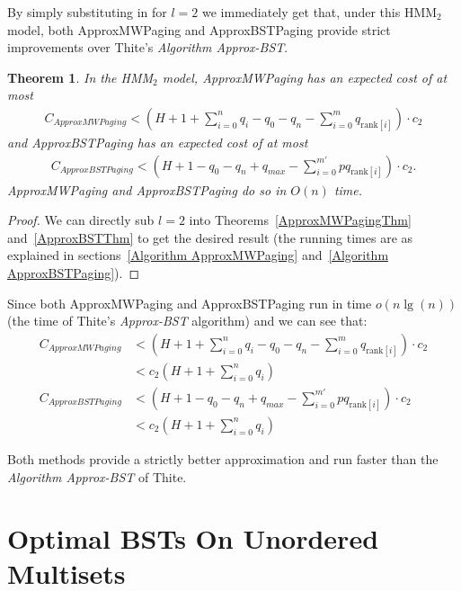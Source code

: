 \documentclass[letterpaper,12pt,titlepage,oneside,final]{book}
\theoremstyle{plain}
\newtheorem{thm}{Theorem}[section]
\begin{document}
By simply substituting in for $l=2$ we immediately get that, under this HMM$_2$ model, both ApproxMWPaging and ApproxBSTPaging provide strict improvements over Thite's \textit{Algorithm Approx-BST}. 

\begin{thm}
In the HMM$_2$ model, ApproxMWPaging has an expected cost of at most \\
\begin{align*}
C_{ApproxMWPaging} < (H + 1 + \sum_{i=0}^n q_i - q_0 - q_n - \sum_{i=0}^m q_{\text{rank}[i]}) \cdot  c_2
\end{align*}
and ApproxBSTPaging has an expected cost of at most
\begin{align*}
C_{ApproxBSTPaging} <  (H + 1 - q_0 - q_n + q_{max} - \sum_{i=0}^{m'} pq_{\text{rank}[i]})\cdot c_2.
\end{align*}
ApproxMWPaging and ApproxBSTPaging do so in $O(n)$ time.
\end{thm}

\begin{proof}
We can directly sub $l=2$ into Theorems~\ref{ApproxMWPagingThm} and~\ref{ApproxBSTThm} to get the desired result (the running times are as explained in sections~\ref{Algorithm ApproxMWPaging} and~\ref{Algorithm ApproxBSTPaging}).
\end{proof}

Since both ApproxMWPaging and ApproxBSTPaging run in time $o(n\lg(n))$ (the time of Thite's \textit{Approx-BST} algorithm) and we can see that:\\
\begin{align*}
C_{ApproxMWPaging} &< (H + 1 + \sum_{i=0}^n q_i - q_0 - q_n - \sum_{i=0}^m q_{\text{rank}[i]}) \cdot  c_2 \\
&< c_2(H+1+\sum_{i=0}^{n}q_i) \\
 C_{ApproxBSTPaging} &< (H + 1 - q_0 - q_n + q_{max} - \sum_{i=0}^{m'} pq_{\text{rank}[i]})\cdot c_2 \\
 &< c_2(H+1+\sum_{i=0}^{n}q_i)
 \end{align*}

Both methods provide a strictly better approximation and run faster than the \textit{Algorithm Approx-BST} of Thite.

\chapter{Optimal BSTs On Unordered Multisets}\label{BST over Multisets}
\end{document}
